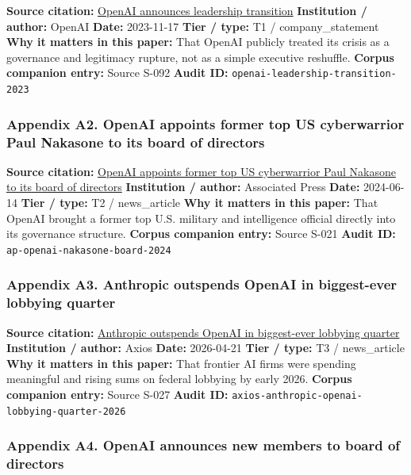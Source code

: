 \documentclass[
  american,
  11pt,
  letterpaper,
]{article}
\begin{document}
\textbf{Source citation:}
\href{https://openai.com/index/openai-announces-leadership-transition/}{OpenAI
announces leadership transition} \textbf{Institution / author:} OpenAI
\textbf{Date:} 2023-11-17 \textbf{Tier / type:} T1 / company\_statement
\textbf{Why it matters in this paper:} That OpenAI publicly treated its
crisis as a governance and legitimacy rupture, not as a simple executive
reshuffle. \textbf{Corpus companion entry:} Source S-092 \textbf{Audit
ID:} \texttt{openai-leadership-transition-2023}

\subsubsection{Appendix A2. OpenAI appoints former top US cyberwarrior
Paul Nakasone to its board of
directors}\label{appendix-a2-openai-appoints-former-top-us-cyberwarrior-paul-nakasone-to-its-board-of-directors}

\textbf{Source citation:}
\href{https://apnews.com/article/6ef612a3a0fcaef05480bbd1ebbd79b1}{OpenAI
appoints former top US cyberwarrior Paul Nakasone to its board of
directors} \textbf{Institution / author:} Associated Press
\textbf{Date:} 2024-06-14 \textbf{Tier / type:} T2 / news\_article
\textbf{Why it matters in this paper:} That OpenAI brought a former top
U.S. military and intelligence official directly into its governance
structure. \textbf{Corpus companion entry:} Source S-021 \textbf{Audit
ID:} \texttt{ap-openai-nakasone-board-2024}

\subsubsection{Appendix A3. Anthropic outspends OpenAI in biggest-ever
lobbying
quarter}\label{appendix-a3-anthropic-outspends-openai-in-biggest-ever-lobbying-quarter}

\textbf{Source citation:}
\href{https://www.axios.com/2026/04/21/anthropic-outspends-openai-biggest-lobbying-quarter}{Anthropic
outspends OpenAI in biggest-ever lobbying quarter} \textbf{Institution /
author:} Axios \textbf{Date:} 2026-04-21 \textbf{Tier / type:} T3 /
news\_article \textbf{Why it matters in this paper:} That frontier AI
firms were spending meaningful and rising sums on federal lobbying by
early 2026. \textbf{Corpus companion entry:} Source S-027 \textbf{Audit
ID:} \texttt{axios-anthropic-openai-lobbying-quarter-2026}

\subsubsection{Appendix A4. OpenAI announces new members to board of
directors}\label{appendix-a4-openai-announces-new-members-to-board-of-directors}
\end{document}
